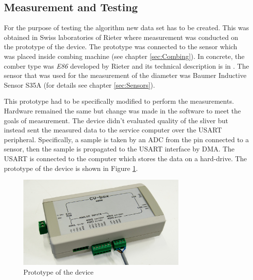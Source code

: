 \documentclass[twoside]{ctuthesis}
\theoremstyle{plain}
\theoremstyle{definition}
\theoremstyle{note}
\begin{document}
\subsection{Measurement and Testing}
\label{sec:MeasurmentAndTesting}
For the purpose of testing the algorithm new data set has to be created. This was obtained in Swiss laboratories of Rieter where measurement was conducted on the prototype of the device. The prototype was connected to the sensor which was placed inside combing machine (see chapter \ref{sec:Combing}). In concrete, the comber type was \textit{E86} developed by Rieter and its technical description is in \cite{cite:ComberE86}. The sensor that was used for the measurement of the diameter was Baumer Inductive Sensor S35A (for details see chapter \ref{sec:Sensors}).

This prototype had to be specifically modified to perform the measurements. Hardware remained the same but change was made in the software to meet the goals of measurement. The device didn't evaluated quality of the sliver but instead sent the measured data to the service computer over the USART peripheral. Specifically, a sample is taken by an ADC from the pin connected to a sensor, then the sample is propagated to the USART interface by DMA. The USART is connected to the computer which stores the data on a hard-drive. The prototype of the device is shown in Figure \ref{fig:cvBox_covered}.
\begin{figure}[h]
	\centering
	\includegraphics[width=0.75\textwidth]{cvBox_covered.jpg}
	\caption{Prototype of the device}
	\label{fig:cvBox_covered}
\end{figure}
\end{document}
